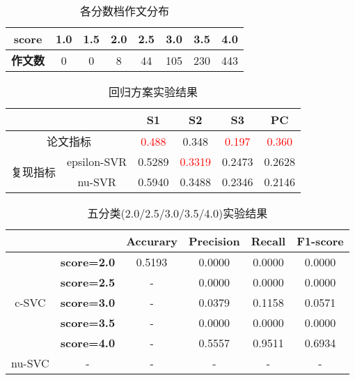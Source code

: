 \documentclass[11pt]{article}
\begin{document}
\begin{CJK}{UTF8}{gkai}
\begin{table}[htbp]
  \centering
  \begin{tabular}{c|c|c|c|c|c|c|c}
    \hline
    \textbf{score} & \textbf{1.0} & \textbf{1.5} & \textbf{2.0} & \textbf{2.5} & \textbf{3.0} & \textbf{3.5} & \textbf{4.0} \\
    \hline
    \textbf{作文数} & 0     & 0     & 8     & 44    & 105   & 230   & 443 \\
    \hline
  \end{tabular}%
  \caption{各分数档作文分布}
  \label{tab:addlabel}%
\end{table}%


\begin{table}[htbp]
  \centering
  \begin{tabular}{c|c|c|c|c|c}
    \hline
    \multicolumn{2}{c}{} & \textbf{S1} & \textbf{S2} & \textbf{S3} & \textbf{PC} \\
    \hline
    \multicolumn{2}{c|}{论文指标} & \textcolor{red}{0.488}  & 0.348  & \textcolor{red}{0.197}  & \textcolor{red}{0.360}  \\
    \hline
    \multirow{2}[0]{*}{复现指标} & epsilon-SVR & 0.5289  & \textcolor{red}{0.3319}  & 0.2473  & 0.2628  \\
    \cline{2-6}
    & nu-SVR & 0.5940  & 0.3488  & 0.2346  & 0.2146  \\
    \hline
  \end{tabular}%
  \caption{回归方案实验结果}
  \label{tab:addlabel}%
\end{table}%


\begin{table}[htbp]
  \centering
  \begin{tabular}{c|c|c|c|c|c}
    \hline
    &       & \textbf{Accurary} & \textbf{Precision} & \textbf{Recall} & \textbf{F1-score} \\
    \hline
    \multirow{5}[0]{*}{c-SVC} & \textbf{score=2.0} & 0.5193 & 0.0000  & 0.0000  & 0.0000 \\
    \cline{2-6}
    & \textbf{score=2.5} & - & 0.0000  & 0.0000  & 0.0000  \\
    \cline{2-6}
    & \textbf{score=3.0} & - & 0.0379  & 0.1158 & 0.0571 \\
    \cline{2-6}
    & \textbf{score=3.5} & - & 0.0000  & 0.0000  & 0.0000  \\
    \cline{2-6}
    & \textbf{score=4.0} & - & 0.5557  & 0.9511  & 0.6934  \\
    \hline
    nu-SVC &    -   &   -    &   -    &   -    & - \\
    \hline
  \end{tabular}%
  \caption{五分类(2.0/2.5/3.0/3.5/4.0)实验结果}
  \label{tab:addlabel}%
\end{table}%



\end{CJK}
\end{document}
